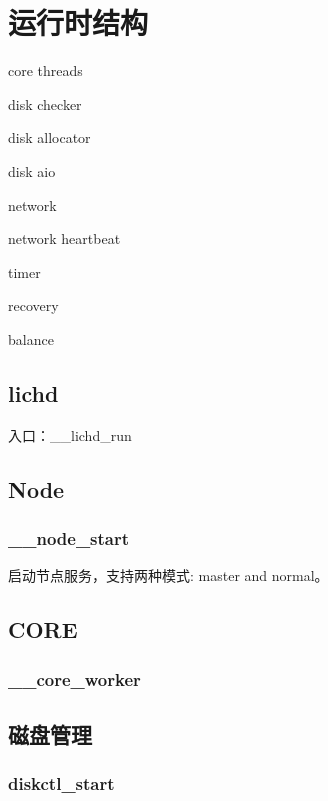 \chapter{运行时结构}

\begin{compactitem}
\item core threads
\item disk checker
\item disk allocator
\item disk aio
\item network
\item network heartbeat
\item timer
\item recovery
\item balance
\end{compactitem}

\section{lichd}

入口：\_\_lichd\_run

\section{Node}

\subsection{\_\_node\_start}

启动节点服务，支持两种模式: master and normal。

\section{CORE}

\subsection{\_\_core\_worker}

\section{磁盘管理}

\subsection{diskctl\_start}
